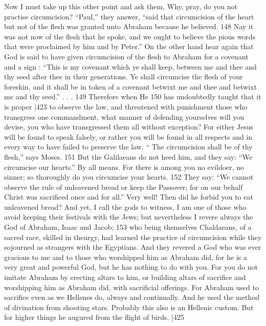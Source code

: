 Now I must take up this other point and ask them, Why, pray, do you not practise circumcision? ``Paul,'' they answer, ``said that circumcision of the heart but not of the flesh was granted unto Abraham because he believed. 148 Nay it was not now of the flesh that he spoke, and we ought to believe the pious words that were proclaimed by him and by Peter.'' On the other hand hear again that God is said to have given circumcision of the flesh to Abraham for a covenant and a sign : ``This is my covenant which ye shall keep, between me and thee and thy seed after thee in their generations. Ye shall circumcise the flesh of your foreskin, and it shall be in token of a covenant betwixt me and thee and betwixt me and thy seed.'' . . . 149 Therefore when He
150 has undoubtedly taught that it is proper |423
to observe the law, and threatened with punishment those who transgress one commandment, what manner of defending yourselves will you devise, you who have transgressed them all without exception? For either Jesus will be found to speak falsely, or rather you will be found in all respects and in every way to have failed to preserve the law. `` The circumcision shall be of thy flesh,'' says Moses. 151 But the Galilaeans do not heed him, and they say: ``We circumcise our hearts.'' By all means. For there is among you no evildoer, no sinner; so thoroughly do you circumcise your hearts. 152 They say: ``We cannot observe the rule of unleavened bread or keep the Passover; for on our behalf Christ was sacrificed once and for all.'' Very well! Then did he forbid you to eat unleavened bread? And yet, I call the gods to witness, I am one of those who avoid keeping their festivals with the Jews; but nevertheless I revere always the God of Abraham, Isaac and Jacob; 153 who being themselves Chaldaeans, of a sacred race, skilled in theurgy, had learned the practice of circumcision while they sojourned as strangers with the Egyptians. And they revered a God who was ever gracious to me and to those who worshipped him as Abraham did, for he is a very great and powerful God, but he has nothing to do with you. For you do not imitate Abraham by erecting altars to him, or building altars of sacrifice and worshipping him as Abraham did, with sacrificial offerings. For Abraham used to sacrifice even as we Hellenes do, always and continually. And he used the method of divination from shooting stars. Probably this also is an Hellenic custom. But for higher things he augured from the flight of birds.
|425


